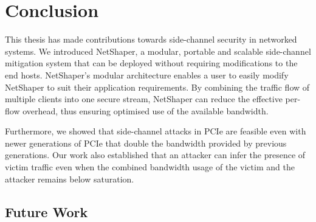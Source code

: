 \chapter{Conclusion}
\label{chap:conclusion}

This thesis has made contributions towards side-channel security in networked systems.
We introduced NetShaper, a modular, portable and scalable side-channel mitigation system that can be deployed without requiring modifications to the end hosts.
NetShaper's modular architecture enables a user to easily modify NetShaper to suit their application requirements.
By combining the traffic flow of multiple clients into one secure stream, NetShaper can reduce the effective per-flow overhead, thus ensuring optimised use of the available bandwidth.

Furthermore, we showed that side-channel attacks in PCIe are feasible even with newer generations of PCIe that double the bandwidth provided by previous generations.
Our work also established that an attacker can infer the presence of victim traffic even when the combined bandwidth usage of the victim and the attacker remains below saturation.

\section{Future Work}

